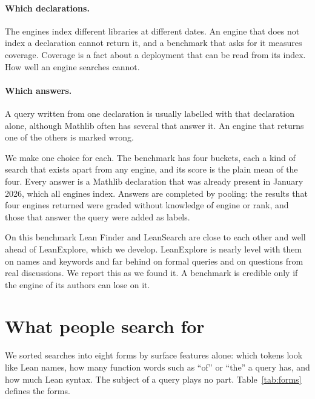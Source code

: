 \documentclass{article}
\begin{document}
\paragraph{Which declarations.} The engines index different libraries at
different dates. An engine that does not index a declaration cannot return it,
and a benchmark that asks for it measures coverage. Coverage is a fact about a
deployment that can be read from its index. How well an engine searches cannot.

\paragraph{Which answers.} A query written from one declaration is usually
labelled with that declaration alone, although Mathlib often has several that
answer it. An engine that returns one of the others is marked wrong.

We make one choice for each. The benchmark has four buckets, each a kind of
search that exists apart from any engine, and its score is the plain mean of
the four. Every answer is a Mathlib declaration that was already present in
January 2026, which all engines index. Answers are completed by pooling: the
results that four engines returned were graded without knowledge of engine or
rank, and those that answer the query were added as labels.

On this benchmark Lean Finder and LeanSearch are close to each other and well
ahead of LeanExplore, which we develop. LeanExplore is nearly level with them
on names and keywords and far behind on formal queries and on questions from
real discussions. We report this as we found it. A benchmark is credible
only if the engine of its authors can lose on it.

\section{What people search for}
\label{sec:searches}

We sorted searches into eight forms by surface features alone: which tokens
look like Lean names, how many function words such as ``of'' or ``the'' a
query has, and how much Lean syntax. The subject of a query plays no part.
Table~\ref{tab:forms} defines the forms.
\end{document}
